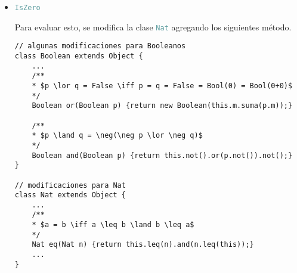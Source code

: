 \documentclass{article}
\newcommand{\tp}[1]{\textcolor{CadetBlue} {\texttt{#1}}}
\begin{document}
\begin{enumerate}
\begin{enumerate}
\begin{itemize}
\begin{verbatim}
    // $\mathbb{Z} \cong \mathbb{N}^2$
    Int(Nat i, Nat d) {super(); this.i = i; this.d = d;}

    // $(x, y) +_{\mathbb{Z}} (z, w) = (x+_{\mathbb{N}}y, z+_{\mathbb{N}}w)$
    Int suma(Int n) {return new Int(this.i.suma(n.i), this.d.suma(n.d));}

    // $(x, y) \leq_{\mathbb{Z}} (z, w) \iff xz \leq_{\mathbb{N}} yz$
    Boolean lt(Int n) {return this.i.suma(n.d).lt(n.i.suma(this.d));}

    // $-(a, b) = (b, a)$
    Int neg() {return new Int(this.d, this.i);}
}
                \end{verbatim}

                Hay que modificar la clase de \tp{NumExpr} para manejar enteros
                \begin{verbatim}
// modificaciones para manejar enteros
class NumExpr extends Expr {
    Int v;

    NumExpr(Int v) {super(); this.v = v;}
    ...
}
                \end{verbatim}

                Y con estas nuevas modificaciones se define \tp{NegExpr}
                \begin{verbatim}
// manejar expresiones con negativos
class NegExpr extends Expr {
    Expr e;

    NegExpr(Expr e) {this.e = e;}

    Boolean isAtom() {return (new Booelan(new Nat(this))).false();}

    Expr eval() {return this.e.eval().neg();}
}
                \end{verbatim}
                \item \tp{IsZero}

                Para evaluar esto, se modifica la clase \tp{Nat} agregando los
                siguientes método.

                \begin{verbatim}
// algunas modificaciones para Booleanos
class Boolean extends Object {
    ...
    /**
    * $p \lor q = False \iff p = q = False = Bool(0) = Bool(0+0)$
    */
    Boolean or(Boolean p) {return new Boolean(this.m.suma(p.m));}

    /**
    * $p \land q = \neg(\neg p \lor \neg q)$
    */
    Boolean and(Boolean p) {return this.not().or(p.not()).not();}
}

// modificaciones para Nat
class Nat extends Object {
    ...
    /**
    * $a = b \iff a \leq b \land b \leq a$
    */
    Nat eq(Nat n) {return this.leq(n).and(n.leq(this));}
    ...
}


\end{verbatim}
\end{itemize}
\end{enumerate}
\end{enumerate}
\end{document}
